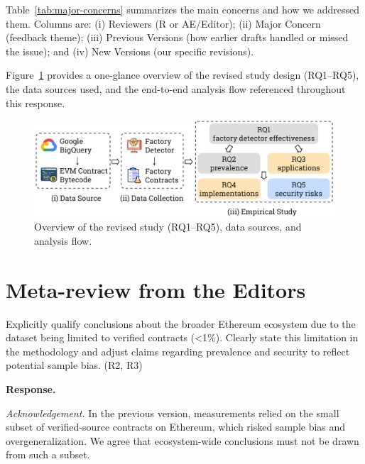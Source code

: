 \documentclass[acmsmall]{acmart}
\begin{document}
	
	Table~\ref{tab:major-concerns} summarizes the main concerns and how we addressed them. Columns
	are: (i) Reviewers (R or AE/Editor); (ii) Major Concern (feedback theme); (iii) Previous Versions
	(how earlier drafts handled or missed the issue); and (iv) New Versions (our specific revisions).

	\noindent
	Figure~\ref{fig:overview} provides a one-glance overview of the revised study design (RQ1--RQ5),
	the data sources used, and the end-to-end analysis flow referenced throughout this response.

	\vspace{0.5em}
	\begin{figure}[t]
		\centering
		\includegraphics[width=0.9\linewidth]{figure/overview.pdf}
		\caption{Overview of the revised study (RQ1--RQ5), data sources, and analysis flow.}
		\label{fig:overview}
	\end{figure}

	\newpage

	\section*{Meta-review from the Editors}

	\begin{tcolorbox}
		[commentbox,title=Editor/AE -- Comment 1] Explicitly qualify conclusions about the broader
		Ethereum ecosystem due to the dataset being limited to verified contracts (<1\%). Clearly state
		this limitation in the methodology and adjust claims regarding prevalence and security to reflect
		potential sample bias. (R2, R3)
	\end{tcolorbox}

	\noindent
	\textbf{Response.}

	\textit{Acknowledgement.} In the previous version, measurements relied on the small subset of verified-source
	contracts on Ethereum, which risked sample bias and overgeneralization. We agree that ecosystem-wide
	conclusions must not be drawn from such a subset.
\end{document}
